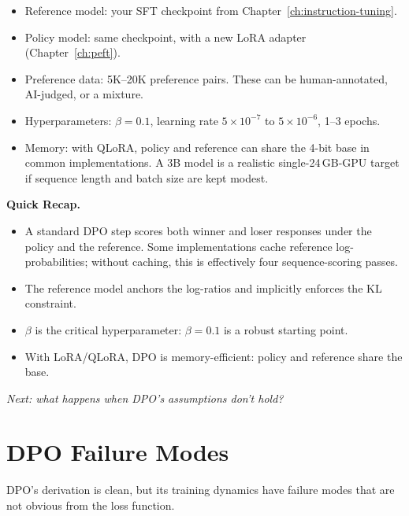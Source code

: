 \begin{tcolorbox}[colback=orange!5, colframe=orange!60, title=\textbf{For Project~3: DPO Training Setup}]
\begin{itemize}[nosep]
  \item Reference model: your SFT checkpoint from Chapter~\ref{ch:instruction-tuning}.
  \item Policy model: same checkpoint, with a new LoRA adapter (Chapter~\ref{ch:peft}).
  \item Preference data: 5K--20K preference pairs. These can be human-annotated, AI-judged, or a mixture.
  \item Hyperparameters: $\beta = 0.1$, learning rate $5 \times 10^{-7}$ to $5 \times 10^{-6}$, 1--3 epochs.
  \item Memory: with QLoRA, policy and reference can share the 4-bit base in common implementations. A 3B model is a realistic single-24\,GB-GPU target if sequence length and batch size are kept modest.
\end{itemize}
\end{tcolorbox}

\begin{quickrecap}
\textbf{Quick Recap.}
\begin{itemize}[nosep,leftmargin=1.5em]
  \item A standard DPO step scores both winner and loser responses under the policy and the reference. Some implementations cache reference log-probabilities; without caching, this is effectively four sequence-scoring passes.
  \item The reference model anchors the log-ratios and implicitly enforces the KL constraint.
  \item $\beta$ is the critical hyperparameter: $\beta = 0.1$ is a robust starting point.
  \item With LoRA/QLoRA, DPO is memory-efficient: policy and reference share the base.
\end{itemize}
\textit{Next: what happens when DPO's assumptions don't hold?}
\end{quickrecap}


\section{DPO Failure Modes}
\label{sec:dpo-failures}

DPO's derivation is clean, but its training dynamics have failure modes that are not obvious from the loss function.

